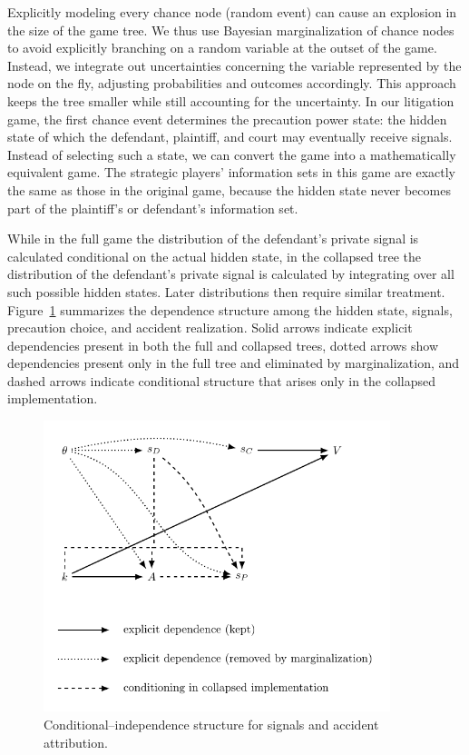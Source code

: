 \documentclass{article}
\begin{document}
Explicitly modeling every chance node (random event) can cause an explosion in the size of the game tree. We thus use Bayesian marginalization of chance nodes to avoid explicitly branching on a random variable at the outset of the game. Instead, we integrate out uncertainties concerning the variable represented by the node on the fly, adjusting probabilities and outcomes accordingly. This approach keeps the tree smaller while still accounting for the uncertainty. In our litigation game, the first chance event determines the precaution power state: the hidden state of which the defendant, plaintiff, and court may eventually receive signals. Instead of selecting such a state, we can convert the game into a mathematically equivalent game. The strategic players' information sets in this game are exactly the same as those in the original game, because the hidden state never becomes part of the plaintiff's or defendant's information set. 

While in the full game the distribution of the defendant's private signal is calculated conditional on the actual hidden state, in the collapsed tree the distribution of the defendant's private signal is calculated by integrating over all such possible hidden states. Later distributions then require similar treatment. Figure~\ref{fig:signals_graph.pdf} summarizes the dependence structure among the hidden state, signals, precaution choice, and accident realization. Solid arrows indicate explicit dependencies present in both the full and collapsed trees, dotted arrows show dependencies present only in the full tree and eliminated by marginalization, and dashed arrows indicate conditional structure that arises only in the collapsed implementation.

\begin{figure}[t]
  \centering
  \includegraphics[width=0.9\textwidth]{../Figures/signals_graph.pdf}
  \caption{Conditional–independence structure for signals and accident attribution.}
  \label{fig:signals_graph.pdf}
\end{figure}
\end{document}
